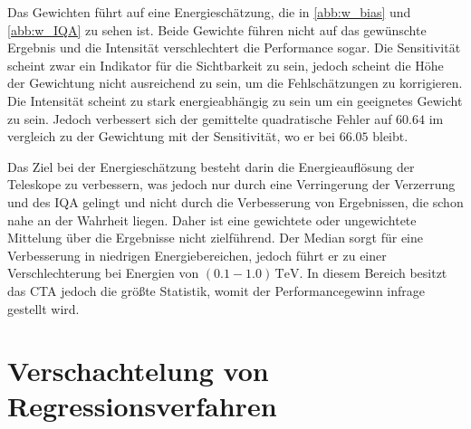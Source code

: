 Das Gewichten führt auf eine Energieschätzung, die in \autoref{abb:w_bias} und \autoref{abb:w_IQA} zu sehen ist.
Beide Gewichte führen nicht auf das gewünschte Ergebnis und die Intensität verschlechtert die Performance sogar.
Die Sensitivität scheint zwar ein Indikator für die Sichtbarkeit zu sein, jedoch scheint die Höhe der Gewichtung nicht ausreichend zu sein, um
die Fehlschätzungen zu korrigieren.
Die Intensität scheint zu stark energieabhängig zu sein um ein geeignetes Gewicht zu sein.
Jedoch verbessert sich der gemittelte quadratische Fehler auf $\num{60.64}$ im vergleich zu der Gewichtung mit der Sensitivität, wo er bei
$\num{66.05}$ bleibt.

Das Ziel bei der Energieschätzung besteht darin die Energieauflösung der Teleskope zu verbessern, was jedoch nur durch eine Verringerung der
Verzerrung und des IQA gelingt und nicht durch die Verbesserung von Ergebnissen, die schon nahe an der Wahrheit liegen.
Daher ist eine gewichtete oder ungewichtete Mittelung über die Ergebnisse nicht zielführend.
Der Median sorgt für eine Verbesserung in niedrigen Energiebereichen, jedoch führt er zu einer Verschlechterung bei Energien von $(\num{0.1}-\num{1.0})\,\si{\tera\eV}$.
In diesem Bereich besitzt das CTA jedoch die größte Statistik, womit der Performancegewinn infrage gestellt wird.


\section{Verschachtelung von Regressionsverfahren}

